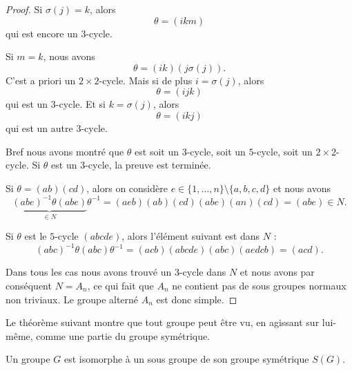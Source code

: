 \begin{proof}
    Si \( \sigma(j)=k\), alors
    \begin{equation}
        \theta=(ikm)
    \end{equation}
    qui est encore un \( 3\)-cycle.

    Si \( m=k\), nous avons
    \begin{equation}
        \theta=(ik)(j\sigma(j)).
    \end{equation}
    C'est a priori un \( 2\times 2\)-cycle. Mais si de plus \( i=\sigma(j)\), alors
    \begin{equation}
        \theta=(ijk)
    \end{equation}
    qui est un \( 3\)-cycle. Et si \( k=\sigma(j)\), alors
    \begin{equation}
        \theta=(ikj)
    \end{equation}
    qui est un autre \( 3\)-cycle.

    Bref nous avons montré que \( \theta\) est soit un \( 3\)-cycle, soit un \( 5\)-cycle, soit un \( 2\times 2\)-cycle. Si \( \theta\) est un \( 3\)-cycle, la preuve est terminée.

    Si \( \theta=(ab)(cd)\), alors on considère \( e\in \{ 1,\ldots, n \}\setminus\{ a,b,c,d \}\) et nous avons
    \begin{equation}
        \underbrace{(abe)^{-1}\theta(abe)}_{\in N}\theta^{-1}=(aeb)(ab)(cd)(abe)(an)(cd)=(abe)\in N.
    \end{equation}
    
    Si \( \theta\) est le \( 5\)-cycle \( (abcde)\), alors l'élément suivant est dans \( N\) :
    \begin{equation}
        (abc)^{-1}\theta(abc)\theta^{-1}=(acb)(abcde)(abc)(aedcb)=(acd).
    \end{equation}
    
    Dans tous les cas nous avons trouvé un \( 3\)-cycle dans \( N\) et nous avons par conséquent \( N=A_n\), ce qui fait que \( A_n\) ne contient pas de sous groupes normaux non triviaux. Le groupe alterné \( A_n\) est donc simple.

\end{proof}

Le théorème suivant montre que tout groupe peut être vu, en agissant sur lui-même, comme une partie du groupe symétrique.
\begin{theorem}
    Un groupe \( G\) est isomorphe à un sous groupe de son groupe symétrique \( S(G)\).
\end{theorem}

